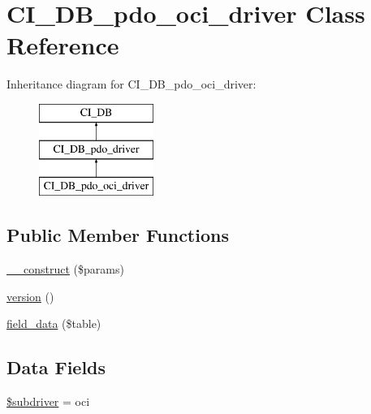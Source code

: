 \hypertarget{class_c_i___d_b__pdo__oci__driver}{}\section{C\+I\+\_\+\+D\+B\+\_\+pdo\+\_\+oci\+\_\+driver Class Reference}
\label{class_c_i___d_b__pdo__oci__driver}
Inheritance diagram for C\+I\+\_\+\+D\+B\+\_\+pdo\+\_\+oci\+\_\+driver\+:\begin{figure}[H]
\begin{center}
\leavevmode
\includegraphics[height=3.000000cm]{class_c_i___d_b__pdo__oci__driver}
\end{center}
\end{figure}
\subsection*{Public Member Functions}
\begin{DoxyCompactItemize}
\item 
\mbox{\hyperlink{class_c_i___d_b__pdo__oci__driver_a9162320adff1a1a4afd7f2372f753a3e}{\+\_\+\+\_\+construct}} (\$params)
\item 
\mbox{\hyperlink{class_c_i___d_b__pdo__oci__driver_a6080dae0886626b9a4cedb29240708b1}{version}} ()
\item 
\mbox{\hyperlink{class_c_i___d_b__pdo__oci__driver_a90355121e1ed009e0efdbd544ab56efa}{field\+\_\+data}} (\$table)
\end{DoxyCompactItemize}
\subsection*{Data Fields}
\begin{DoxyCompactItemize}
\item 
\mbox{\hyperlink{class_c_i___d_b__pdo__oci__driver_a1322ca756348b11d080cb7a4f590de15}{\$subdriver}} = \textquotesingle{}oci\textquotesingle{}
\end{DoxyCompactItemize}
